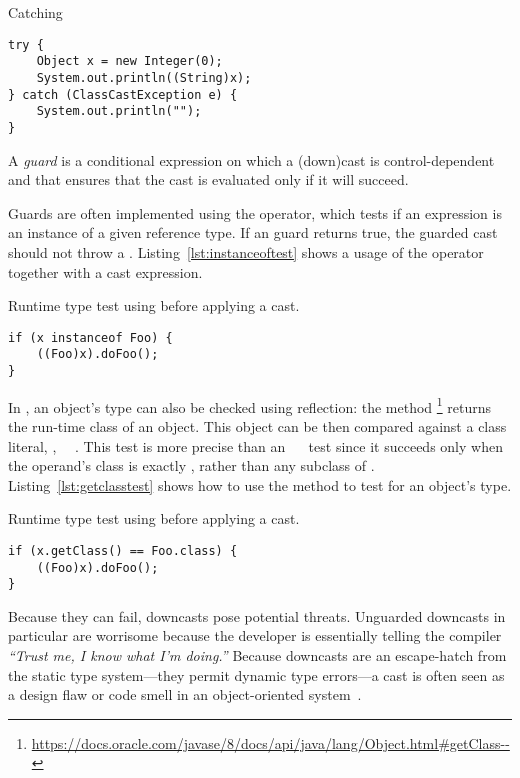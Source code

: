 \begin{listing}[H]
\caption{Catching }
\label{lst:catchcce}
\begin{verbatim}	
try {
	Object x = new Integer(0);
	System.out.println((String)x); 
} catch (ClassCastException e) { 
	System.out.println(""); 
}
\end{verbatim}
\end{listing}

A \emph{guard} is a conditional expression on which a (down)cast is control-dependent and that ensures that the cast is evaluated only if it will succeed.

Guards are often implemented using the  operator, which tests
if an expression is an instance of a given reference type.
If an  guard returns true, the guarded cast should not throw
a .
Listing~\ref{lst:instanceoftest} shows a usage of the  operator together with a cast expression.

\begin{listing}[H]
\caption{Runtime type test using  before applying a cast.}
\label{lst:instanceoftest}
\begin{verbatim}
if (x instanceof Foo) {
	((Foo)x).doFoo();
}
\end{verbatim}
\end{listing}

In \java{}, an object's type can also be checked using reflection:
the  method%
\footnote{\url{https://docs.oracle.com/javase/8/docs/api/java/lang/Object.html\#getClass--}}
returns the run-time class of an object.
This  object can be then compared against a class literal, \eg,
~\code{==}~.
This test is more precise than an ~~ test since it succeeds only when the operand's class is exactly ,
rather than any subclass of .
Listing~\ref{lst:getclasstest} shows how to use the  method to test for an object's type.

\begin{listing}[H]
\caption{Runtime type test using  before applying a cast.}
\label{lst:getclasstest}
\begin{verbatim}
if (x.getClass() == Foo.class) {
	((Foo)x).doFoo(); 
}
\end{verbatim}
\end{listing}

Because they can fail,
downcasts pose potential threats.
Unguarded downcasts in particular are
worrisome because the developer is essentially telling the compiler
\emph{``Trust me, I know what I'm doing.''}
Because downcasts are an escape-hatch from the static type system---they
permit dynamic type errors---a cast is often seen as a design flaw or code
smell in an object-oriented system~\citep{tufanoWhenWhyYour2015}.

